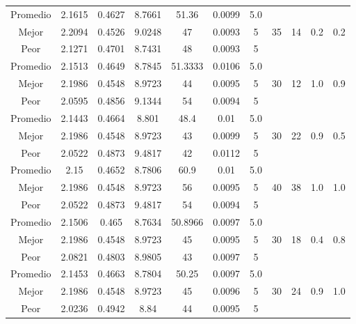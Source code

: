 \begin{table}[h!]
\begin{center}
\begin{tabular}{|c|c|c|c|c|c|c|c|c|c|c|}
        \hline
        \hline
            Promedio  & 2.1615 & 0.4627 & 8.7661 & 51.36 & 0.0099 & 5.0 &  &  &  & \\
            \cline{1-7}
            Mejor & 2.2094 & 0.4526  & 9.0248 & 47 & 0.0093 & 5 & 35 & 14 & 0.2 & 0.2\\
            \cline{1-7}
            Peor & 2.1271 & 0.4701  & 8.7431 & 48 & 0.0093 & 5 &  &  &  & \\
        \hline
        \hline
            Promedio  & 2.1513 & 0.4649 & 8.7845 & 51.3333 & 0.0106 & 5.0 &  &  &  & \\
            \cline{1-7}
            Mejor & 2.1986 & 0.4548  & 8.9723 & 44 & 0.0095 & 5 & 30 & 12 & 1.0 & 0.9\\
            \cline{1-7}
            Peor & 2.0595 & 0.4856  & 9.1344 & 54 & 0.0094 & 5 &  &  &  & \\
        \hline
        \hline
            Promedio  & 2.1443 & 0.4664 & 8.801 & 48.4 & 0.01 & 5.0 &  &  &  & \\
            \cline{1-7}
            Mejor & 2.1986 & 0.4548  & 8.9723 & 43 & 0.0099 & 5 & 30 & 22 & 0.9 & 0.5\\
            \cline{1-7}
            Peor & 2.0522 & 0.4873  & 9.4817 & 42 & 0.0112 & 5 &  &  &  & \\
        \hline
        \hline
            Promedio  & 2.15 & 0.4652 & 8.7806 & 60.9 & 0.01 & 5.0 &  &  &  & \\
            \cline{1-7}
            Mejor & 2.1986 & 0.4548  & 8.9723 & 56 & 0.0095 & 5 & 40 & 38 & 1.0 & 1.0\\
            \cline{1-7}
            Peor & 2.0522 & 0.4873  & 9.4817 & 54 & 0.0094 & 5 &  &  &  & \\
        \hline
        \hline
            Promedio  & 2.1506 & 0.465 & 8.7634 & 50.8966 & 0.0097 & 5.0 &  &  &  & \\
            \cline{1-7}
            Mejor & 2.1986 & 0.4548  & 8.9723 & 45 & 0.0095 & 5 & 30 & 18 & 0.4 & 0.8\\
            \cline{1-7}
            Peor & 2.0821 & 0.4803  & 8.9805 & 43 & 0.0097 & 5 &  &  &  & \\
        \hline
        \hline
            Promedio  & 2.1453 & 0.4663 & 8.7804 & 50.25 & 0.0097 & 5.0 &  &  &  & \\
            \cline{1-7}
            Mejor & 2.1986 & 0.4548  & 8.9723 & 45 & 0.0096 & 5 & 30 & 24 & 0.9 & 1.0\\
            \cline{1-7}
            Peor & 2.0236 & 0.4942  & 8.84 & 44 & 0.0095 & 5 &  &  &  & \\

\end{tabular}
\end{center}
\end{table}
